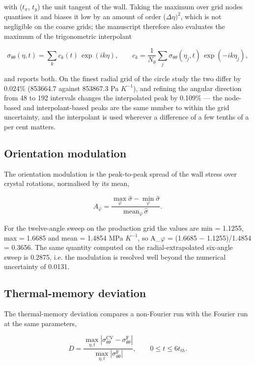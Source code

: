 \documentclass[preprint,12pt]{elsarticle}
\begin{document}
with ($t_{x}$, $t_{y}$) the unit tangent of the wall. Taking the maximum over grid nodes quantises it and biases it low by an amount of order ($\Delta \eta )^{2}$, which is not negligible on the coarse grids; the manuscript therefore also evaluates the maximum of the trigonometric interpolant

\begin{equation}
\sigma_{\theta\theta}(\eta,t)=\sum_k c_k(t)\,\exp(ik\eta),\qquad c_k=\frac{1}{N_\theta}\sum_j\sigma_{\theta\theta}(\eta_j,t)\,\exp(-ik\eta_j), 
\label{eq:25}
\end{equation}

and reports both. On the finest radial grid of the circle study the two differ by 0.024\% (853664.7 against 853867.3 Pa $K^{-1}$), and refining the angular direction from 48 to 192 intervals changes the interpolated peak by 0.109\% --- the node-based and interpolant-based peaks are the same number to within the grid uncertainty, and the interpolant is used wherever a difference of a few tenths of a per cent matters.

\subsection{Orientation modulation}
\label{sec:9.2}

The orientation modulation is the peak-to-peak spread of the wall stress over crystal rotations, normalised by its mean,

\begin{equation}
A_\varphi=\frac{\max_\varphi\hat\sigma-\min_\varphi\hat\sigma}{\mathrm{mean}_\varphi\,\hat\sigma}. 
\label{eq:26}
\end{equation}

For the twelve-angle sweep on the production grid the values are min = 1.1255, max = 1.6685 and mean = 1.4854 MPa $K^{-1}$, so A\_$\varphi$ = (1.6685 $-$ 1.1255)/1.4854 = 0.3656. The same quantity computed on the radial-extrapolated six-angle sweep is 0.2875, i.e. the modulation is resolved well beyond the numerical uncertainty of 0.0131.

\subsection{Thermal-memory deviation}
\label{sec:9.3}

The thermal-memory deviation compares a non-Fourier run with the Fourier run at the same parameters,

\begin{equation}
D=\frac{\max_{\eta,t}\left|\sigma_{\theta\theta}^{\mathrm{CV}}-\sigma_{\theta\theta}^{\mathrm{F}}\right|}{\max_{\eta,t}\left|\sigma_{\theta\theta}^{\mathrm{F}}\right|},\qquad0\leq t\leq 6t_{th}. 
\label{eq:27}
\end{equation}
\end{document}

